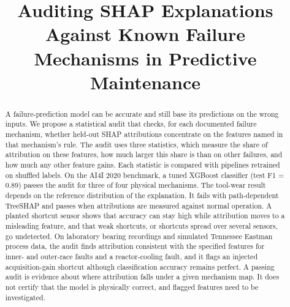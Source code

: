 \documentclass[conference]{IEEEtran}
\begin{document}

\title{Auditing SHAP Explanations Against Known Failure Mechanisms in Predictive Maintenance\\
}

\author{
}

\maketitle

\begin{abstract}
A failure-prediction model can be accurate and still base its predictions on the wrong inputs. We propose a statistical audit that checks, for each documented failure mechanism, whether held-out SHAP attributions concentrate on the features named in that mechanism's rule. The audit uses three statistics, which measure the share of attribution on these features, how much larger this share is than on other failures, and how much any other feature gains. Each statistic is compared with pipelines retrained on shuffled labels. On the AI4I 2020 benchmark, a tuned XGBoost classifier (test F1 = 0.89) passes the audit for three of four physical mechanisms. The tool-wear result depends on the reference distribution of the explanation. It fails with path-dependent TreeSHAP and passes when attributions are measured against normal operation. A planted shortcut sensor shows that accuracy can stay high while attribution moves to a misleading feature, and that weak shortcuts, or shortcuts spread over several sensors, go undetected. On laboratory bearing recordings and simulated Tennessee Eastman process data, the audit finds attribution consistent with the specified features for inner- and outer-race faults and a reactor-cooling fault, and it flags an injected acquisition-gain shortcut although classification accuracy remains perfect. A passing audit is evidence about where attribution falls under a given mechanism map. It does not certify that the model is physically correct, and flagged features need to be investigated.
\end{abstract}
\end{document}
